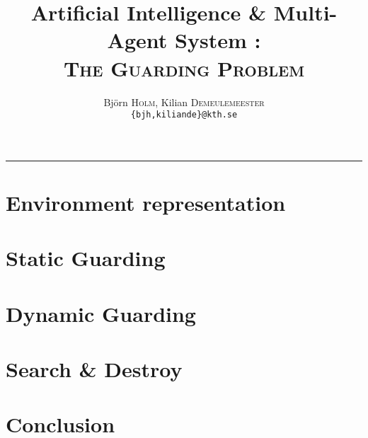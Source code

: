 \documentclass[a4paper,9pt,twocolumn]{extarticle}
\title{Artificial Intelligence \& Multi-Agent System :\\ \textsc{The Guarding Problem}}
\author{Björn \textsc{Holm}, Kilian \textsc{Demeulemeester} \\ \texttt{\{bjh,kiliande\}@kth.se}}
\begin{document}

 \maketitle

\tableofcontents

\vspace{0.5cm}
\hrule
\vspace{0.5cm}



\section{Environment representation}


\section{Static Guarding}



\section{Dynamic Guarding}



\section{Search \& Destroy}


\section*{Conclusion}


\nocite{*}


\end{document}
